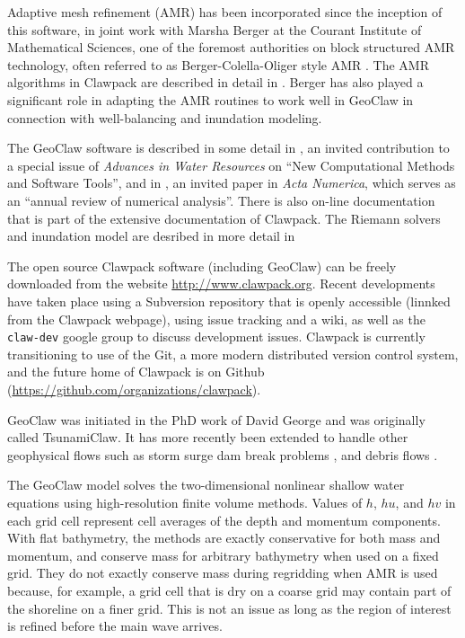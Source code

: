 Adaptive mesh refinement (AMR) has been
incorporated since the inception of this software, 
in joint work with Marsha Berger at the
Courant Institute of Mathematical Sciences, one of the foremost authorities
on block structured AMR technology, often referred to as
Berger-Colella-Oliger style AMR \cite{berger-colella, berger-oliger}.  The
AMR algorithms in Clawpack are described in detail in
\cite{mjb-rjl:amrclaw}.  
Berger has also played a significant role in adapting the AMR routines to
work well in GeoClaw \cite{BergerGeorgeLeVequeMandli:awr11,
LeVequeGeorgeBerger:an11} in connection with well-balancing and inundation
modeling.

The GeoClaw software is described in some detail in
\cite{BergerGeorgeLeVequeMandli:awr11}, an invited contribution to a special
issue of
{\it Advances in Water Resources} on
``New Computational Methods and Software Tools'',
and in \cite{LeVequeGeorgeBerger:an11}, an invited paper in {\it Acta
Numerica}, which serves as an ``annual review of numerical analysis''.
There is also 
on-line documentation \cite{geoclaw-doc} that is part of the extensive
documentation of Clawpack.
The Riemann solvers and inundation model are desribed in more detail in
\cite{dgeorge:phd,George2008}

The open source Clawpack software (including GeoClaw) can be freely
downloaded from the website \url{http://www.clawpack.org}.  
Recent developments have taken
place using a Subversion repository that is openly accessible (linnked from
the Clawpack webpage), using issue tracking and a wiki, as well as the {\tt
claw-dev} google group to discuss development issues.  Clawpack is currently
transitioning to use of the Git, a more modern distributed version control
system, and the future home of Clawpack is on Github
(\url{https://github.com/organizations/clawpack}).

GeoClaw was initiated in the PhD work of David George
\cite{dgeorge:phd,rjl-george:catalina04a,dg-rjl:tsunami06,George2008} and
was originally called TsunamiClaw.  It has more recently been extended to
handle other geophysical flows such as storm surge \cite{mandli:phd}
dam break problems \cite{George:Malpasset}, and debris flows
\cite{GeorgeIverson2011}.

The GeoClaw model solves the two-dimensional nonlinear shallow water equations 
using high-resolution finite volume methods.  Values of $h$, $hu$, and $hv$
in each grid cell represent cell averages of the depth and momentum
components.  With flat bathymetry, the methods are exactly conservative for
both mass and momentum, and conserve mass for arbitrary bathymetry when used
on a fixed grid. They do not exactly conserve mass during regridding when
AMR is used because, for example, a grid cell that is dry on a coarse grid
may contain part of the shoreline on a finer grid.  This is not an issue as
long as the region of interest is refined before the main wave arrives.


